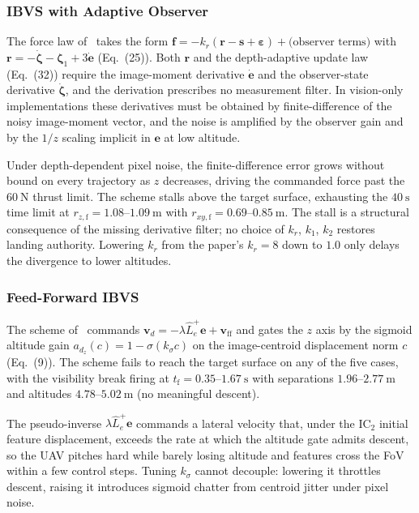 \documentclass[10pt,journal]{IEEEtran}
\begin{document}
\subsubsection{IBVS with Adaptive Observer \cite{chen2025}}

The force law of~\cite{chen2025} takes the form $\boldsymbol{f}=-k_r(\boldsymbol{r}-\boldsymbol{s}+\boldsymbol{\varepsilon})+\text{(observer terms)}$ with $\boldsymbol{r}=-\dot{\boldsymbol{\zeta}}-\boldsymbol{\zeta}_1+3\dot{\boldsymbol{e}}$ (Eq.~(25)). Both $\boldsymbol{r}$ and the depth-adaptive update law (Eq.~(32)) require the image-moment derivative $\dot{\boldsymbol{e}}$ and the observer-state derivative $\dot{\boldsymbol{\zeta}}$, and the derivation prescribes no measurement filter. In vision-only implementations these derivatives must be obtained by finite-difference of the noisy image-moment vector, and the noise is amplified by the observer gain and by the $1/z$ scaling implicit in $\boldsymbol{e}$ at low altitude.

Under depth-dependent pixel noise, the finite-difference error grows without bound on every trajectory as $z$ decreases, driving the commanded force past the $60~\text{N}$ thrust limit. The scheme stalls above the target surface, exhausting the $40~\text{s}$ time limit at $r_{z,\text{f}}=1.08$--$1.09~\text{m}$ with $r_{xy,\text{f}}=0.69$--$0.85~\text{m}$. The stall is a structural consequence of the missing derivative filter; no choice of $k_r$, $k_1$, $k_2$ restores landing authority. Lowering $k_r$ from the paper's $k_r=8$ down to $1.0$ only delays the divergence to lower altitudes.

\subsubsection{Feed-Forward IBVS \cite{cho2022}}

The scheme of~\cite{cho2022} commands $\boldsymbol{v}_d=-\lambda\hat{L}_e^+\boldsymbol{e}+\boldsymbol{v}_{\text{ff}}$ and gates the $z$ axis by the sigmoid altitude gain $a_{d_z}(c)=1-\sigma(k_\sigma c)$ on the image-centroid displacement norm $c$ (Eq.~(9)). The scheme fails to reach the target surface on any of the five cases, with the visibility break firing at $t_\text{f}=0.35$--$1.67~\text{s}$ with separations $1.96$--$2.77~\text{m}$ and altitudes $4.78$--$5.02~\text{m}$ (no meaningful descent).

The pseudo-inverse $\lambda\hat{L}_e^+\boldsymbol{e}$ commands a lateral velocity that, under the IC$_2$ initial feature displacement, exceeds the rate at which the altitude gate admits descent, so the UAV pitches hard while barely losing altitude and features cross the FoV within a few control steps. Tuning $k_\sigma$ cannot decouple: lowering it throttles descent, raising it introduces sigmoid chatter from centroid jitter under pixel noise.
\end{document}
